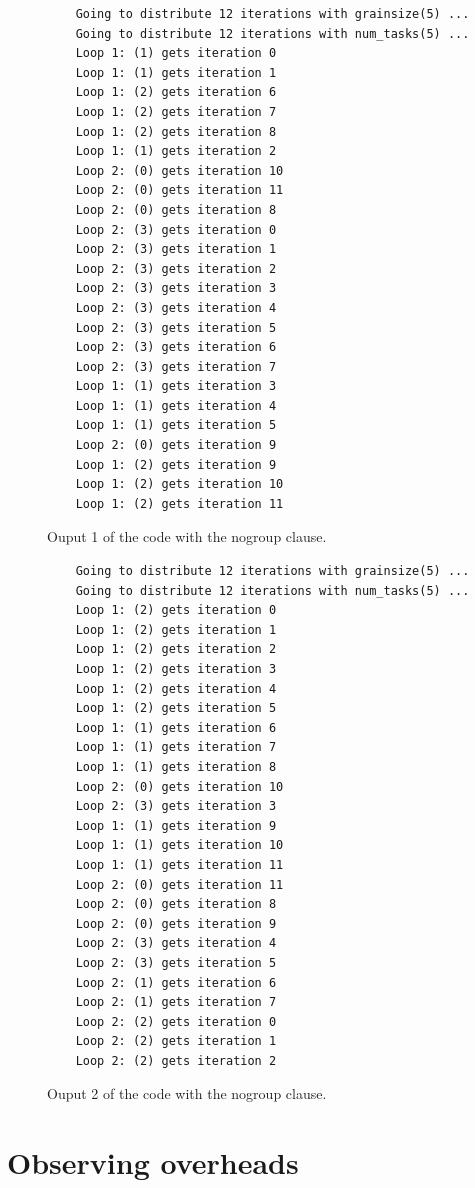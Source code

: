 \documentclass[12pt, a4paper]{article}
\begin{document}
\begin{figure}[H]
	\begin{lstlisting}
	Going to distribute 12 iterations with grainsize(5) ...
	Going to distribute 12 iterations with num_tasks(5) ...
	Loop 1: (1) gets iteration 0
	Loop 1: (1) gets iteration 1
	Loop 1: (2) gets iteration 6
	Loop 1: (2) gets iteration 7
	Loop 1: (2) gets iteration 8
	Loop 1: (1) gets iteration 2
	Loop 2: (0) gets iteration 10
	Loop 2: (0) gets iteration 11
	Loop 2: (0) gets iteration 8
	Loop 2: (3) gets iteration 0
	Loop 2: (3) gets iteration 1
	Loop 2: (3) gets iteration 2
	Loop 2: (3) gets iteration 3
	Loop 2: (3) gets iteration 4
	Loop 2: (3) gets iteration 5
	Loop 2: (3) gets iteration 6
	Loop 2: (3) gets iteration 7
	Loop 1: (1) gets iteration 3
	Loop 1: (1) gets iteration 4
	Loop 1: (1) gets iteration 5
	Loop 2: (0) gets iteration 9
	Loop 1: (2) gets iteration 9
	Loop 1: (2) gets iteration 10
	Loop 1: (2) gets iteration 11
	\end{lstlisting}
	
	\caption{Ouput 1 of the code with the nogroup clause.}
	\label{Ouput 1 of the code with the nogroup clause.}
\end{figure}

\begin{figure}[H]
	\begin{lstlisting}
	Going to distribute 12 iterations with grainsize(5) ...
	Going to distribute 12 iterations with num_tasks(5) ...
	Loop 1: (2) gets iteration 0
	Loop 1: (2) gets iteration 1
	Loop 1: (2) gets iteration 2
	Loop 1: (2) gets iteration 3
	Loop 1: (2) gets iteration 4
	Loop 1: (2) gets iteration 5
	Loop 1: (1) gets iteration 6
	Loop 1: (1) gets iteration 7
	Loop 1: (1) gets iteration 8
	Loop 2: (0) gets iteration 10
	Loop 2: (3) gets iteration 3
	Loop 1: (1) gets iteration 9
	Loop 1: (1) gets iteration 10
	Loop 1: (1) gets iteration 11
	Loop 2: (0) gets iteration 11
	Loop 2: (0) gets iteration 8
	Loop 2: (0) gets iteration 9
	Loop 2: (3) gets iteration 4
	Loop 2: (3) gets iteration 5
	Loop 2: (1) gets iteration 6
	Loop 2: (1) gets iteration 7
	Loop 2: (2) gets iteration 0
	Loop 2: (2) gets iteration 1
	Loop 2: (2) gets iteration 2
	\end{lstlisting}
	
	\caption{Ouput 2 of the code with the nogroup clause.}
	\label{Ouput 2 of the code with the nogroup clause.}
\end{figure}

\section{Observing overheads}
\end{document}
